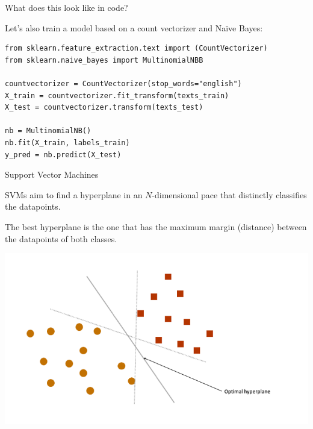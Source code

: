 \documentclass[handout]{beamer}
\begin{document}
\begin{frame}[fragile]{What does this look like in code?}
	
Let's also train a model based on a count vectorizer and Naïve Bayes:
	
\begin{lstlisting}
from sklearn.feature_extraction.text import (CountVectorizer)
from sklearn.naive_bayes import MultinomialNBB

countvectorizer = CountVectorizer(stop_words="english")
X_train = countvectorizer.fit_transform(texts_train)
X_test = countvectorizer.transform(texts_test)

nb = MultinomialNB()
nb.fit(X_train, labels_train)
y_pred = nb.predict(X_test)
\end{lstlisting}
	
\end{frame}




\begin{frame}{Support Vector Machines}
	
	SVMs aim to find a hyperplane in an \(N\)-dimensional pace that distinctly classifies the datapoints.
	
	The best hyperplane is the one that has the maximum margin (distance) between the datapoints of both classes.
	
	\begin{center}
		\includegraphics[width=\linewidth,height=0.5\textheight,keepaspectratio]{../pictures/optimal_hyperplane.png} \\\
	\end{center}
	
\end{frame}
\end{document}
